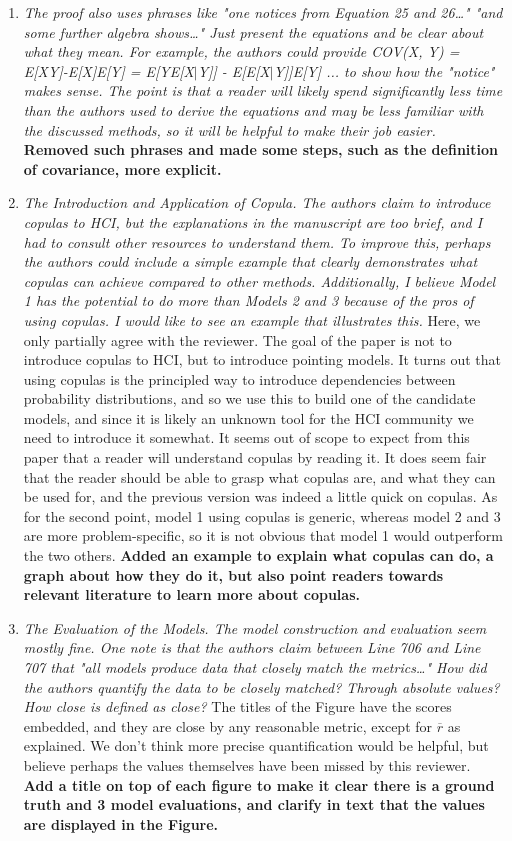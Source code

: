 \documentclass{article}
\begin{document}
\begin{enumerate}
    \item \textit{The proof also uses phrases like "one notices from Equation 25 and 26…" "and some further algebra shows…" Just present the equations and be clear about what they mean. For example, the authors could provide COV(X, Y) = E[XY]-E[X]E[Y] = E[YE[X$\vert$Y]] - E[E[X$\vert$Y]]E[Y] ... to show how the "notice" makes sense. The point is that a reader will likely spend significantly less time than the authors used to derive
    the equations and may be less familiar with the discussed methods, so it will be helpful to make their job easier.} \textbf{Removed such phrases and made some steps, such as the definition of covariance, more explicit.}
    \item \textit{The Introduction and Application of Copula. The authors claim to introduce copulas to HCI, but the explanations in the manuscript are too brief, and I had to consult other resources to understand them. To improve this, perhaps the authors could include a simple example that clearly demonstrates what copulas can achieve compared to other methods. Additionally, I believe Model 1 has the potential to do more than Models 2 and 3 because of the pros of using copulas. I would like to see an example that illustrates this.} Here, we only partially agree with the reviewer. The goal of the paper is not to introduce copulas to HCI, but to introduce pointing models. It turns out that using copulas is the principled way to introduce dependencies between probability distributions, and so we use this to build one of the candidate models, and since it is likely an unknown tool for the HCI community we need to introduce it somewhat. It seems out of scope to expect from this paper that a reader will understand copulas by reading it. It does seem fair that the reader should be able to grasp what copulas are, and what they can be used for, and the previous version was indeed a little quick on copulas. As for the second point, model 1 using copulas is generic, whereas model 2 and 3 are more problem-specific, so it is not obvious that model 1 would outperform the two others. \textbf{Added an example to explain what copulas can do, a  graph about how they do it, but also point readers towards relevant literature to learn more about copulas.}
    \item \textit{The Evaluation of the Models. The model construction and evaluation seem mostly fine. One note is that the authors claim between Line 706 and Line 707 that "all models produce data that closely match the metrics…" How did the authors quantify the data to be closely matched? Through absolute values? How close is defined as close?} The titles of the Figure have the scores embedded, and they are close by any reasonable metric, except for $\overline{r}$ as explained. We don't think more precise quantification would be helpful, but believe perhaps the values themselves have been missed by this reviewer. \textbf{Add a title on top of each figure to make it clear there is a ground truth and 3 model evaluations, and clarify in text that the values are displayed in the Figure.}

\end{enumerate}
\end{document}
